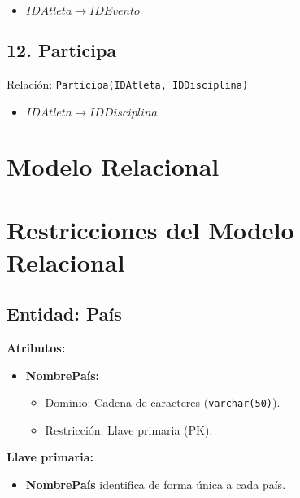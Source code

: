 \begin{itemize}
    \item $IDAtleta \rightarrow  IDEvento$
\end{itemize}

\subsection*{12. Participa}
Relación: \texttt{Participa(IDAtleta, IDDisciplina)}

\begin{itemize}
    \item $IDAtleta \rightarrow IDDisciplina$
\end{itemize}

\section*{Modelo Relacional}
\section*{Restricciones del Modelo Relacional}

\subsection*{Entidad: País}
\textbf{Atributos:}
\begin{itemize}
    \item \textbf{NombrePaís:}
    \begin{itemize}
        \item Dominio: Cadena de caracteres (\texttt{varchar(50)}).
        \item Restricción: Llave primaria (PK).
    \end{itemize}
\end{itemize}
\textbf{Llave primaria:}
\begin{itemize}
    \item \textbf{NombrePaís} identifica de forma única a cada país.
\end{itemize}

